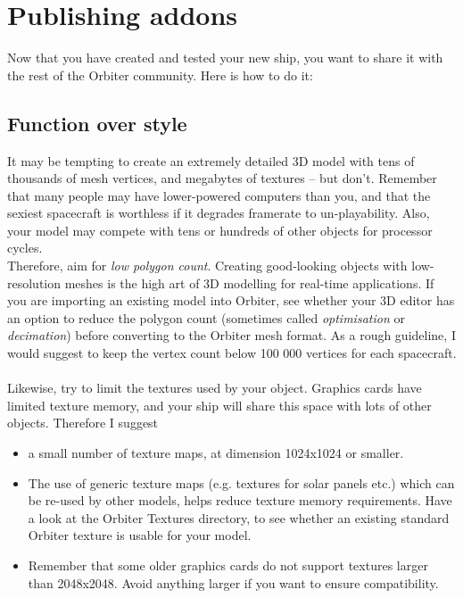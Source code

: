 \documentclass[Orbiter Developer Manual.tex]{subfiles}
\begin{document}
\section{Publishing addons}
Now that you have created and tested your new ship, you want to share it with the rest of the Orbiter community. Here is how to do it:

\subsection{Function over style}
It may be tempting to create an extremely detailed 3D model with tens of thousands of mesh vertices, and megabytes of textures – but don’t. Remember that many people may have lower-powered computers than you, and that the sexiest spacecraft is worthless if it degrades framerate to un-playability. Also, your model may compete with tens or hundreds of other objects for processor cycles.\\
Therefore, aim for \textit{low polygon count}. Creating good-looking objects with low-resolution meshes is the high art of 3D modelling for real-time applications. If you are importing an existing model into Orbiter, see whether your 3D editor has an option to reduce the polygon count (sometimes called \textit{optimisation} or \textit{decimation}) before converting to the Orbiter mesh format. As a rough guideline, I would suggest to keep the vertex count below 100 000 vertices for each spacecraft.\\
\\
Likewise, try to limit the textures used by your object. Graphics cards have limited texture memory, and your ship will share this space with lots of other objects. Therefore I suggest

\begin{itemize}
\item a small number of texture maps, at dimension 1024x1024 or smaller.
\item The use of generic texture maps (e.g. textures for solar panels etc.) which can be re-used by other models, helps reduce texture memory requirements. Have a look at the Orbiter Textures directory, to see whether an existing standard Orbiter texture is usable for your model.
\item Remember that some older graphics cards do not support textures larger than 2048x2048. Avoid anything larger if you want to ensure compatibility.
\end{itemize}
\end{document}
